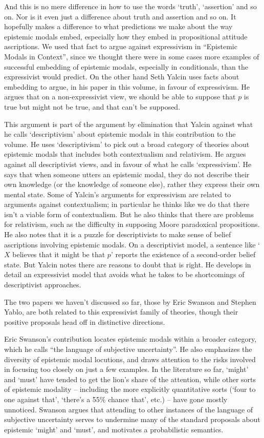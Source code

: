 And this is no mere difference in how to use the words `truth', `assertion' and so on. Nor is it even just a difference about truth and assertion and so on. It hopefully makes a difference to what predictions we make about the way epistemic modals embed, especially how they embed in propositional attitude ascriptions. We used that fact to argue against expressivism in ``Epistemic Modals in Context'', since we thought there were in some cases more examples of successful embedding of epistemic modals, especially in conditionals, than the expressivist would predict. On the other hand Seth Yalcin uses facts about embedding to argue, in his paper in this volume, in favour of expressivism. He argues that on a non-expressivist view, we should be able to suppose that $p$ is true but might not be true, and that can't be supposed.

This argument is part of the argument by elimination that Yalcin against what he calls `descriptivism' about epistemic modals in this contribution to the volume. He uses `descriptivism' to pick out a broad category of theories about epistemic modals that includes both contextualism and relativism. He argues against all descriptivist views, and in favour of what he calls `expressivism'. He says that when someone utters an epistemic modal, they do not describe their own knowledge (or the knowledge of someone else), rather they express their own mental state. Some of Yalcin's arguments for expressivism are related to arguments against contextualism; in particular he thinks like we do that there isn't a viable form of contextualism. But he also thinks that there are problems for relativism, such as the difficulty in supposing Moore paradoxical propositions. He also notes that it is a puzzle for descriptivists to make sense of belief ascriptions involving epistemic modals. On a descriptivist model, a sentence like `$X$ believes that it might be that $p$' reports the existence of a second-order belief state. But Yalcin notes there are reasons to doubt that is right. He develops in detail an expressivist model that avoids what he takes to be shortcomings of descriptivist approaches.

The two papers we haven't discussed so far, those by Eric Swanson and Ste\-phen Yablo, are both related to this expressivist family of theories, though their positive proposals head off in distinctive directions.

Eric Swanson's contribution locates epistemic modals within a broader category, which he calls ``the language of subjective uncertainty''.  He also emphasizes the diversity of epistemic modal locutions, and draws attention to the risks involved in focusing too closely on just a few examples.  In the literature so far, `might' and `must' have tended to get the lion's share of the attention, while other sorts of epistemic modality -- including the more explicitly quantitative sorts (`four to one against that', `there's a 55\% chance that', etc.) -- have gone mostly unnoticed.  Swanson argues that attending to other instances of the language of subjective uncertainty serves to undermine many of the standard proposals about epistemic `might' and `must', and motivates a probabilistic semantics.

